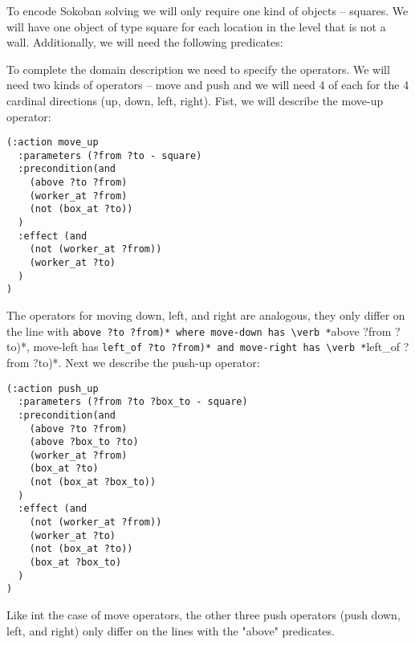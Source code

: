 \documentclass[runningheads]{llncs}
\begin{document}
To encode Sokoban solving we will only require one kind of objects -- squares. We will have one
object of type square for each location in the level that is not a wall. Additionally, we will
need the following predicates:
To complete the domain description we need to specify the operators. We will need two kinds
of operators -- move and push and we will need 4 of each for the 4 cardinal directions (up, down, left, right).
Fist, we will describe the move-up operator:
\begin{verbatim}
(:action move_up
  :parameters (?from ?to - square)
  :precondition(and
    (above ?to ?from)
    (worker_at ?from)
    (not (box_at ?to))
  )
  :effect (and
    (not (worker_at ?from))
    (worker_at ?to)
  )
)
\end{verbatim}
The operators for moving down, left, and right are analogous, they only differ on the line with
\verb *(above ?to ?from)* where move-down has \verb *(above ?from ?to)*, move-left has
\verb *(left_of ?to ?from)* and move-right has \verb *(left_of ?from ?to)*.
Next we describe the push-up operator:
\begin{verbatim}
(:action push_up
  :parameters (?from ?to ?box_to - square)
  :precondition(and
    (above ?to ?from)
    (above ?box_to ?to)
    (worker_at ?from)
    (box_at ?to)
    (not (box_at ?box_to))
  )
  :effect (and
    (not (worker_at ?from))
    (worker_at ?to)
    (not (box_at ?to))
    (box_at ?box_to)
  )
)
\end{verbatim}
Like int the case of move operators, the other three push operators (push down, left, and right) only differ
on the lines with the "above" predicates.
\end{document}
